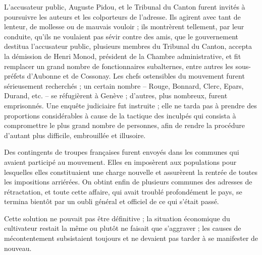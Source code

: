 \documentclass[french,twoside]{book} %
\begin{document}
L’accusateur public, Auguste Pidou, et le Tribunal du Canton furent invités à poursuivre les auteurs et les colporteurs de l’adresse. Ils agirent avec tant de lenteur, de mollesse ou de mauvais vouloir ; ils montrèrent tellement, par leur conduite, qu’ils ne voulaient pas sévir contre des amis, que le gouvernement destitua l’accusateur public, plusieurs membres du Tribunal du Canton, accepta la démission de Henri Monod, président de la Chambre administrative, et fit remplacer un grand nombre de fonctionnaires subalternes, entre autres les sous-préfets d’Aubonne et de Cossonay. Les chefs ostensibles du mouvement furent sérieusement recherchés ; un certain nombre – Rouge, Bonnard, Clerc, Epars, Durand, etc. – se réfugièrent à Genève ; d’autres, plus nombreux, furent emprisonnés. Une enquête judiciaire fut instruite ; elle ne tarda pas à prendre des proportions considérables à cause de la tactique des inculpés qui consista à compromettre le plus grand nombre de personnes, afin de rendre la procédure d’autant plus difficile, embrouillée et illusoire.\par
Des contingents de troupes françaises furent envoyés dans les communes qui avaient participé au mouvement. Elles en imposèrent aux populations pour lesquelles elles constituaient une charge nouvelle et assurèrent la rentrée de toutes les impositions arriérées. On obtint enfin de plusieurs communes des adresses de rétractation, et toute cette affaire, qui avait troublé profondément le pays, se termina bientôt par un oubli général et officiel de ce qui s’était passé.\par
Cette solution ne pouvait pas être définitive ; la situation économique du cultivateur restait la même ou plutôt ne faisait que s’aggraver ; les causes de mécontentement subsistaient toujours et ne devaient pas tarder à se manifester de nouveau.
\end{document}
